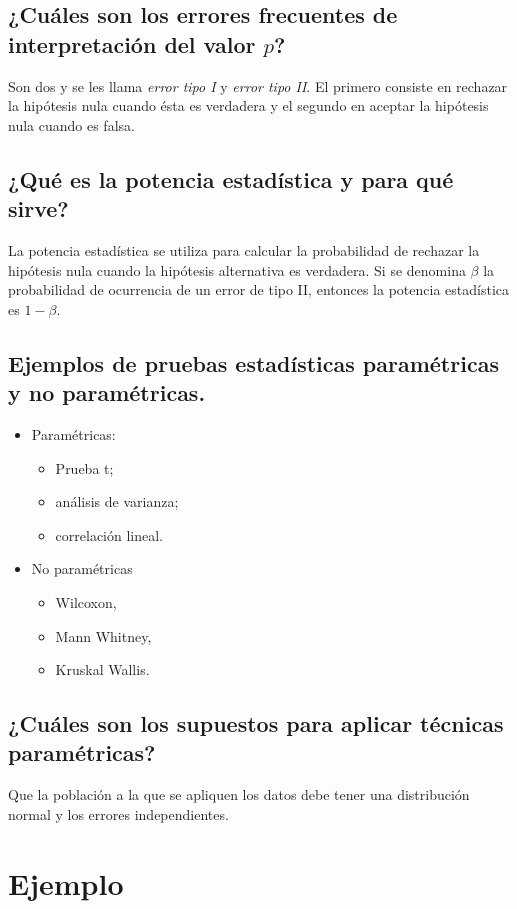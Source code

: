 \documentclass[paper=leter, fontsize=11pt]{scrartcl}
\numberwithin{equation}{section}		%
\numberwithin{figure}{section}			%
\numberwithin{table}{section}				%
\begin{document}
\subsection{¿Cuáles son los errores frecuentes de interpretación del valor $p$?}
Son dos y se les llama \emph{error tipo I} y \emph{error tipo II}. El primero consiste en rechazar la hipótesis nula cuando ésta es verdadera y el segundo en aceptar la hipótesis nula cuando es falsa.

\subsection{¿Qué es la potencia estadística y para qué sirve?}
La potencia estadística se utiliza para calcular la probabilidad de rechazar la hipótesis nula cuando la hipótesis alternativa es verdadera. Si se denomina $\beta$ la probabilidad de ocurrencia de un error de tipo II, entonces la potencia estadística es $1 - \beta$.

\subsection{Ejemplos de pruebas estadísticas paramétricas y no paramétricas.}
\begin{itemize}
    \item Paramétricas:
    \begin{itemize}
        \item Prueba t;
        \item análisis de varianza;
        \item correlación lineal.
    \end{itemize}
    \item No paramétricas
    \begin{itemize}
        \item Wilcoxon,
        \item Mann Whitney,
        \item Kruskal Wallis.
    \end{itemize}
\end{itemize}

\subsection{¿Cuáles son los supuestos para aplicar técnicas paramétricas?}
Que la población a la que se apliquen los datos debe tener una distribución normal y los errores independientes.

\section{Ejemplo}
\end{document}
